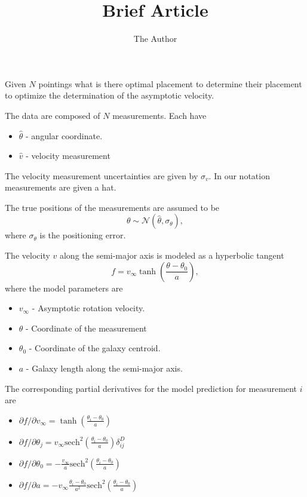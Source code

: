 \documentclass[11pt, oneside]{article}   	%
\title{Brief Article}
\author{The Author}
\begin{document}
\maketitle

Given $N$ pointings what is there optimal placement to determine their placement to optimize the determination of the asymptotic velocity.

The data are composed of $N$ measurements.  Each have
\begin{itemize}
\item $\hat{\theta}$ - angular coordinate.
\item $\hat{v}$ - velocity measurement
\end{itemize}
The velocity measurement uncertainties are given by $\sigma_v$.  In our notation measurements are given a hat.

The true positions of the measurements are assumed to be
\begin{equation}
\theta \sim \mathcal{N}(\hat{\theta},\sigma_\theta),
\end{equation}
where $\sigma_\theta$ is the positioning error.

The velocity $v$ along the semi-major axis is modeled as a hyperbolic tangent
\begin{equation}
f=v_\infty \tanh{\left(\frac{\theta - \theta_0}{a}\right)},
\end{equation}
where the model parameters are
\begin{itemize}
\item $v_\infty$ - Asymptotic rotation velocity.
\item $\theta$ - Coordinate of the measurement
\item $\theta_0$ - Coordinate of the galaxy centroid. 
\item $a$ - Galaxy length along the semi-major axis.
\end{itemize}
The corresponding partial derivatives for the model prediction for measurement $i$ are
\begin{itemize}
\item $\partial f/ \partial v_\infty =  \tanh{\left(\frac{\theta_i - \theta_0}{a}\right)}$
\item $\partial f/ \partial\theta_j = v_\infty  \text{sech}^2{\left(\frac{\theta_i - \theta_0}{a}\right)} \delta^D_{ij}$ 
\item $\partial f/ \partial\theta_0 = -\frac{v_\infty }{a} \text{sech}^2{\left(\frac{\theta_i - \theta_0}{a}\right)}$ 
\item $\partial f/ \partial a =- v_\infty  \frac{\theta_i - \theta_0}{a^2} \text{sech}^2{\left(\frac{\theta_i - \theta_0}{a}\right)}$
\end{itemize}
\end{document}
